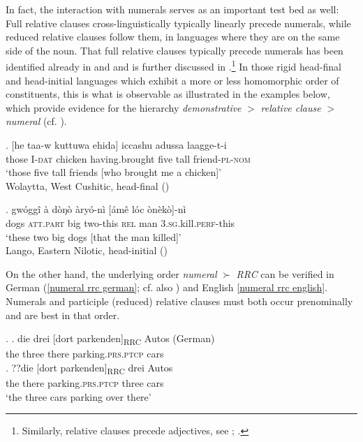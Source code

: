 \documentclass [output=book,colorlinks,citecolor=brown]{langscibook}
\begin{document}
In fact, the interaction with numerals serves as an important test bed as well: Full relative clauses cross-linguistically typically linearly precede numerals, while reduced relative clauses follow them, in languages where they are on the same side of the noun. That full relative clauses typically precede numerals has been identified already in \citet{greenberg:1963:some} and \citet{hawkins:1983:word} and is further discussed in \citet{cinque:2005:deriving, cinque:2023:linearization}.\footnote{Similarly, relative clauses precede adjectives, see \citet{cinque:2005:deriving, cinque:2023:linearization}; \citet[298–299]{rijkhoff:2002:noun}.} In those rigid head-final and head-initial languages which exhibit a more or less homomorphic order of constituents, this is what is observable \citep[ch. 3.5]{cinque:2020:relcl} as illustrated in the examples below, which provide evidence for the hierarchy \textit{demonstrative} $>$ \textit{relative clause} $>$ \textit{numeral} (cf. \citealt[225]{cinque:2020:relcl}).

\exg. [he taa-w kuttuwa ehida] iccashu adussa laagge-t-i\\
those I-\textsc{dat} chicken having.brought five tall friend-\textsc{pl-nom}\\
`those five tall friends [who brought me a chicken]’ \\ \null \hfill Wolaytta, West Cushitic, head-final (\citealt[215]{lamberti:1997:wolyatta})

\exg. gwóggî à dòŋò àryó-nì [ámê lóc\textschwa {} ònèkò]-nì \\
dogs \textsc{att.part} big two-this \textsc{rel} man \textsc{3.sg}.kill.\textsc{perf}-this\\
`these two big dogs [that the man killed]’ \\ \null \hfill Lango, Eastern Nilotic, head-initial (\citealt[156]{noonan:1992:lango})

On the other hand, the underlying order \textit{numeral} $\succ$ \textit{RRC} can be verified in German (\ref{numeral rrc german}; cf. also \citealt{eichinger:1991:ganz, trost:2006:das}) and English \ref{numeral rrc english}. Numerals and participle (reduced) relative clauses must both occur prenominally and are best in that order. %

\ex. \label{numeral rrc german} \ag. die drei [dort parkenden]\textsubscript{RRC} Autos (German)\\
the three there parking.\textsc{prs.ptcp} cars\\
\bg. ??die [dort parkenden]\textsubscript{RRC} drei Autos\\
the there parking.\textsc{prs.ptcp} three cars\\
`the three cars parking over there’
\end{document}
